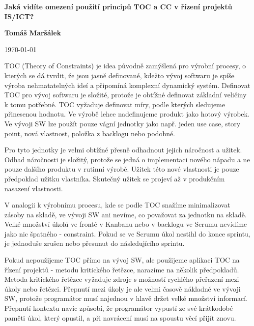 \documentclass[11pt]{article}
\begin{document}
\thispagestyle{empty}
\begin{center}
    \Large
    \textbf{Jaká vidíte omezení použití principů TOC a CC v řízení projektů IS/ICT?}



    \vspace{.3cm}
    \large
    \textbf{Tomáš Maršálek}

    \today

    \vspace{.5cm}
\end{center}

TOC (Theory of Constraints) je idea původně zamýšlená pro výrobní procesy, o
kterých se dá tvrdit, že jsou jasně definované, kdežto vývoj softwaru je spíše
výroba nehmatatelných ideí a připomíná komplexní dynamický systém.  Definovat
TOC pro vývoj softwaru je složité, protože je obtížné definovat základní
veličiny k tomu potřebné.  TOC vyžaduje definovat míry, podle kterých sledujeme
přinesenou hodnotu. Ve výrobě lehce nadefinujeme produkt jako hotový výrobek.
Ve vývoji SW lze použít pouze vágní jednotky jako např. jeden use case, story
point, nová vlastnost, položka z backlogu nebo podobné.

Pro tyto jednotky je velmi obtížné přesně odhadnout jejich náročnost a užitek.
Odhad náročnosti je složitý, protože se jedná o implementaci nového nápadu a ne
pouze dalšího produktu v rutinní výrobě. Užitek této nové vlastnosti je pouze
předpoklad užitku vlastníka. Skutečný užitek se projeví až v produkčním
nasazení vlastnosti. 

V analogii k výrobnímu procesu, kde se podle TOC snažíme minimalizovat zásoby
na skladě, ve vývoji SW ani nevíme, co považovat za jednotku na skladě. Velké
množství úkolů ve frontě v Kanbanu nebo v backlogu ve Scrumu nevidíme jako nic
špatného - constraint. Pokud se ve Scrumu úkol nestihl do konce sprintu, je
jednoduše zrušen nebo přesunut do následujícího sprintu.

Pokud nepoužijeme TOC přímo na vývoj SW, ale použijeme aplikaci TOC na řízení
projektů - metodu kritického řetězce, narazíme na několik předpokladů. Metoda
kritického řetězce vyžaduje zdroje s možností rychlého přeřazení mezi úkoly
nebo řetězci. Přepnutí mezi úkoly je ale velmi časově nákladné ve vývoji SW,
protože programátor musí najednou v hlavě držet velké množství informací.
Přepnutí kontextu navíc způsobí, že programátor vypustí ze své krátkodobé
paměti úkol, který opustil, a při navrácení musí na spoustu věcí přijít znovu.
\end{document}
